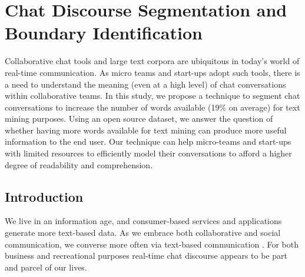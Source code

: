
\chapter{Chat Discourse Segmentation and Boundary Identification} %
\label{ch:TM}

\begin{textsl}
{\small Collaborative chat tools and large text corpora are ubiquitous in today's world of real-time communication. As micro teams and start-ups adopt such tools, there is a need to understand the meaning (even at a high level) of chat conversations within collaborative teams. In this study, we propose a technique to segment chat conversations to increase the number of words available (19\% on average) for text mining purposes. Using an open source dataset, we answer the question of whether having more words available for text mining can produce more useful information to the end user. Our technique can help micro-teams and start-ups with limited resources to efficiently model their conversations to afford a higher degree of readability and comprehension. }
\end{textsl}

\vspace*{1cm}




\section{Introduction}
We live in an information age, and consumer-based services and applications generate more text-based data. As we embrace both collaborative and social communication, we converse more often via text-based communication \cite{talkmore2015} \cite{textstats2016}.  For both business and recreational purposes real-time chat discourse appears to be part and parcel of our lives. 

